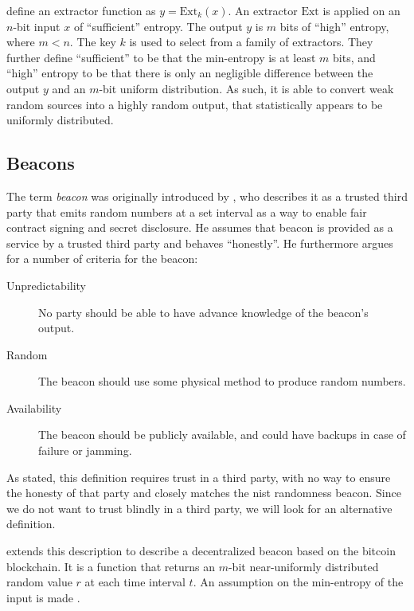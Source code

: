 \citet{bonneau2015bitcoin} define an extractor function as $y = \text{Ext}_k(x)$.
An extractor $\text{Ext}$ is applied on an $n$-bit input $x$ of \enquote{sufficient} entropy.
The output $y$ is $m$ bits of \enquote{high} entropy, where $m < n$. The key $k$ is used to select from a family of extractors.
They further define \enquote{sufficient} to be that the min-entropy is at least $m$ bits, and \enquote{high} entropy to be that there is only an negligible difference between the output $y$ and an $m$-bit uniform distribution.
As such, it is able to convert weak random sources into a highly random output, that statistically appears to be uniformly distributed.

\subsection{Beacons}

The term \emph{beacon} was originally introduced by \citet{rabin1983transaction}, who describes it as a trusted third party that emits random numbers at a set interval as a way to enable fair contract signing and secret disclosure.
He assumes that beacon is provided as a service by a trusted third party and behaves \enquote{honestly}.
He furthermore argues for a number of criteria for the beacon:

\begin{description}
    \item[Unpredictability] No party should be able to have advance knowledge of the beacon's output.
    \item[Random] The beacon should use some physical method to produce random numbers.
    \item[Availability] The beacon should be publicly available, and could have backups in case of failure or jamming.
\end{description}

As stated, this definition requires trust in a third party, with no way to ensure the honesty of that party and closely matches the \gls{nist} randomness beacon.
Since we do not want to trust blindly in a third party, we will look for an alternative definition.

\citet{bonneau2015bitcoin} extends this description to describe a decentralized beacon based on the bitcoin blockchain.
It is a function that returns an $m$-bit near-uniformly distributed random value $r$ at each time interval $t$. An assumption on the min-entropy of the input is made .

